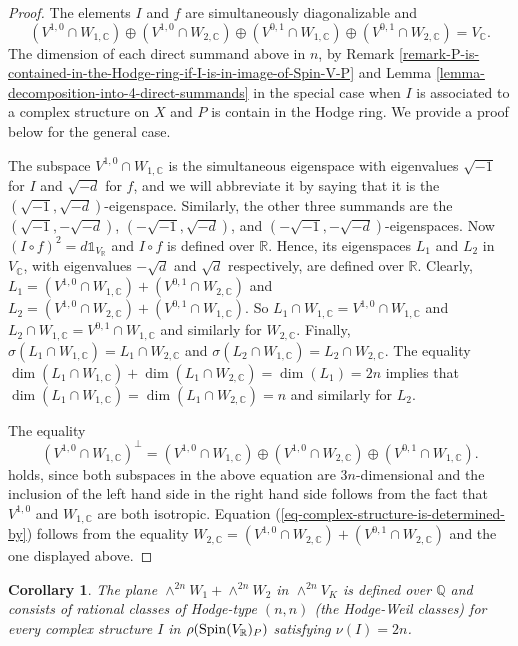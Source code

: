 \documentclass[12pt]{amsart}
\numberwithin{equation}{subsection}
\theoremstyle{plain}
\newtheorem{cor}[thm]{Corollary}
\theoremstyle{definition}
\newcommand{\CC}{{\mathbb C}}
\newcommand{\QQ}{{\mathbb Q}}
\newcommand{\RR}{{\mathbb R}}
\newcommand{\Spin}{{\rm Spin}}
\newcommand{\one}{{\mathbb 1}}
\begin{document}
\begin{proof}
The elements $I$ and $f$ are simultaneously diagonalizable and 
\[
(V^{1,0}\cap W_{1,\CC})\oplus(V^{1,0}\cap W_{2,\CC})\oplus(V^{0,1}\cap W_{1,\CC})\oplus(V^{0,1}\cap W_{2,\CC})=V_\CC.
\]
The dimension of each direct summand above in $n$, by Remark \ref{remark-P-is-contained-in-the-Hodge-ring-if-I-is-in-image-of-Spin-V-P} and Lemma \ref{lemma-decomposition-into-4-direct-summands} in the special case when $I$ is associated to a complex structure on $X$ and $P$ is contain in the Hodge ring. We provide a proof below for the general case.


The subspace $V^{1,0}\cap W_{1,\CC}$ is the simultaneous eigenspace with eigenvalues $\sqrt{-1}$ for $I$ and $\sqrt{-d}$ for $f$, and we will abbreviate it by saying that it is the $(\sqrt{-1},\sqrt{-d})$-eigenspace.
Similarly, the other three summands are the $(\sqrt{-1},-\sqrt{-d})$, $(-\sqrt{-1},\sqrt{-d})$, and $(-\sqrt{-1},-\sqrt{-d})$-eigenspaces. Now $(I\circ f)^2=d\one_{V_\RR}$ and $I\circ f$ is defined over $\RR$. Hence, its eigenspaces 
$L_1$ and $L_2$ in $V_\CC$, with eigenvalues $-\sqrt{d}$ and $\sqrt{d}$ respectively, are defined over $\RR$. 
Clearly, $L_1=(V^{1,0}\cap W_{1,\CC})+(V^{0,1}\cap W_{2,\CC})$ and
$L_2=(V^{1,0}\cap W_{2,\CC})+(V^{0,1}\cap W_{1,\CC})$.
So $L_1\cap W_{1,\CC}=V^{1,0}\cap W_{1,\CC}$ and $L_2\cap W_{1,\CC}=V^{0,1}\cap W_{1,\CC}$ and similarly for $W_{2,\CC}$. Finally, $\sigma(L_1\cap W_{1,\CC})=L_1\cap W_{2,\CC}$ and
$\sigma(L_2\cap W_{1,\CC})=L_2\cap W_{2,\CC}$. The  equality
$\dim(L_1\cap W_{1,\CC})+\dim(L_1\cap W_{2,\CC})=\dim(L_1)=2n$ 
implies that $\dim(L_1\cap W_{1,\CC})=\dim(L_1\cap W_{2,\CC})=n$ 
and similarly for $L_2$.


The equality
\[
\left(V^{1,0}\cap W_{1,\CC}\right)^\perp=
(V^{1,0}\cap W_{1,\CC})\oplus(V^{1,0}\cap W_{2,\CC})\oplus(V^{0,1}\cap W_{1,\CC}).
\]
holds, since
both subspaces in the above equation are $3n$-dimensional and the inclusion of the 
left hand side in the right hand side follows from the fact that $V^{1,0}$ and $W_{1,\CC}$ are both isotropic.
Equation (\ref{eq-complex-structure-is-determined-by}) follows from the equality
$W_{2,\CC}=(V^{1,0}\cap W_{2,\CC})+(V^{0,1}\cap W_{2,\CC})$ and the one displayed above.
\end{proof}


\begin{cor}
\label{cor-plane-of-Hodge-Weil-classes}
The plane $\wedge^{2n}W_1+\wedge^{2n}W_2$ in $\wedge^{2n}V_K$ is defined over $\QQ$ and consists of rational classes of Hodge-type $(n,n)$ (the Hodge-Weil classes) for every complex structure $I$ in $\rho(\Spin(V_\RR)_P)$ satisfying $\nu(I)=2n$.
\end{cor}
\end{document}
